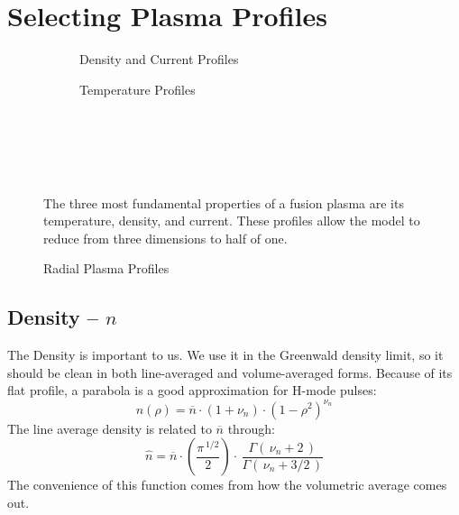 \chapter{Selecting Plasma Profiles}

\label{chapter:profiles}

\begin{figure*}[h]
    \centering
    \hfill
    \begin{subfigure}[t]{0.45\textwidth}
        \centering
		\begin{adjustbox}{width=\textwidth}
			\Large
			
		\end{adjustbox}
        \caption{Density and Current Profiles}
    \end{subfigure}
    \hfill
    \begin{subfigure}[t]{0.45\textwidth}
        \centering
		\begin{adjustbox}{width=\textwidth}
			\Large
			
		\end{adjustbox}
        \caption{Temperature Profiles}
    \end{subfigure}
    \hfill \hfill ~\\ ~\\ ~\\
    \caption{Radial Plasma Profiles} ~\\
    \small The three most fundamental properties of a fusion plasma are its temperature, density, and current. These profiles allow the model to reduce from three dimensions to half of one.
\end{figure*}

\section{Density -- $n$}

The Density is important to us. We use it in the Greenwald density limit, so it should be clean in both line-averaged and volume-averaged forms. Because of its flat profile, a parabola is a good approximation for H-mode pulses:
\begin{equation}
	n(\rho) = \overline{n} \cdot \left(1 + \nu_n \right) \cdot \left( 1 - \rho^2  \right)^{\nu_n}
\end{equation}
The line average density is related to $\overline{n}$ through:
\begin{equation}
	\hat{n} =  \overline{n} \cdot \left( \frac{\pi ^ { \, 1/2} }{2} \right)  \cdot \, \frac{ \Gamma( \, \nu_n + 2 \, ) }{ \Gamma( \, \nu_n + 3/2 \, ) }
\end{equation}
The convenience of this function comes from how the volumetric average comes out.

